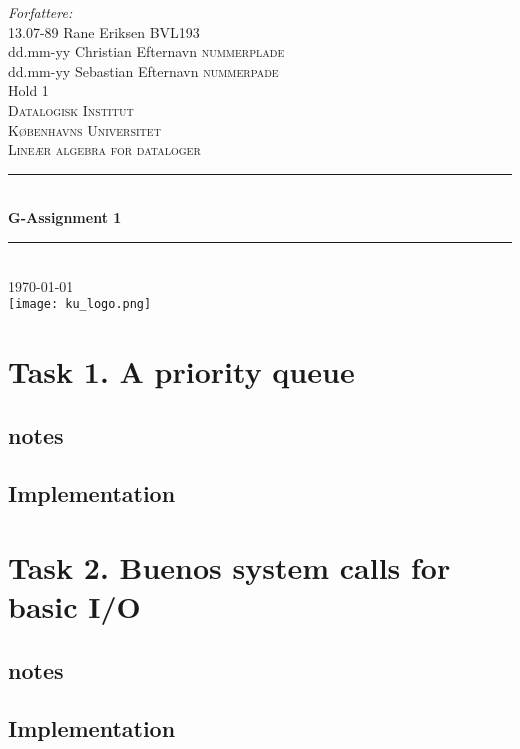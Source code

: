 \documentclass[a4paper,12pt,danish]{report}
\begin{document}
\begin{titlepage}

\newcommand{\HRule}{\rule{\linewidth}{0.4mm}}
\center
\small{ \emph{Forfattere:}\\
13.07-89 Rane Eriksen \textsc{BVL193}
\\
dd.mm-yy Christian Efternavn \textsc{nummerplade}
\\
dd.mm-yy Sebastian Efternavn \textsc{nummerpade}
\\
Hold 1} \\[2cm]

\textsc{\LARGE Datalogisk Institut}\\[0.5cm]
\textsc{\large Københavns Universitet}\\[1.5cm]
\textsc{\large Lineær algebra for dataloger}\\
\HRule \\[0.7cm]
{\huge \bfseries G-Assignment 1}\\[0.4cm]
\HRule \\[1.5cm]
\textsc{\Large \textsc{\today}}\\[0.5cm]

\texttt{[image: ku\_logo.png]}\\[1cm]

\end{titlepage}
\tableofcontents
\newpage
\renewcommand{\thesection}{\arabic{section}}
\renewcommand{\thempfootnote}{\arabic{mpfootnote}}
\renewcommand\thesubsection{}
\newcommand{\minus}[1]{{#1}^{-}}
\section{Task 1. A priority queue}
\subsection{notes}
\subsection{Implementation}
\newpage
\section{Task 2. Buenos system calls for basic I/O}
\subsection{notes}
\subsection{Implementation}
\end{document}
